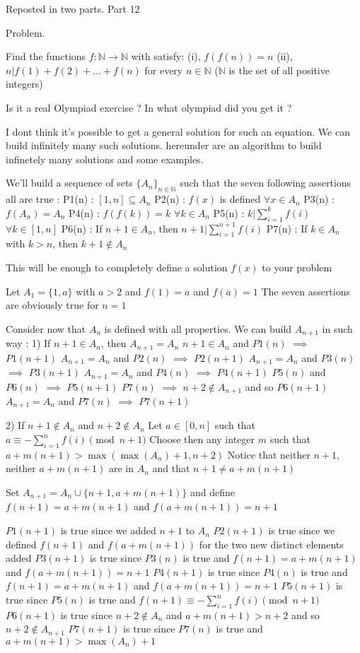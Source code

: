 \begin{solution}
	Reposted in two parts. Part 1\/2
\begin{tcolorbox}\begin{bolded}Problem.\end{bolded} Find the functions $f:\mathbb{N}\rightarrow \mathbb{N}$ with satisfy:
(i), $f(f(n))=n$ 
(ii), $n|f(1)+f(2)+...+f(n)$
for every $n\in \mathbb{N}$ ($\mathbb{N}$ is the set of all positive integers)\end{tcolorbox}
Is it a real Olympiad exercise ?
In what olympiad did you get it ?

I dont think it's possible to get a general solution for such an equation.
We can build infinitely many such solutions. hereunder are an algorithm to build infinetely many solutions and some examples.

We'll build a sequence of sets $\{A_n\}_{n\in\mathbb N}$ such that the seven following assertions all are true :
P1(n) : $[1,n]\subseteq A_n$
P2(n) : $f(x)$ is defined $\forall x\in A_n$
P3(n) : $f(A_n)=A_n$
P4(n) : $f(f(k))=k$ $\forall k\in A_n$
P5(n) : $k|\sum_{i=1}^kf(i)$ $\forall k\in[1,n]$
P6(n) : If $n+1\in A_n$, then $n+1|\sum_{i=1}^{n+1}f(i)$
P7(n) : If $k\in A_n$ with $k>n$, then $k+1\notin A_n$

This will be enough to completely define a solution $f(x)$ to your problem


Let $A_1=\{1,a\}$ with $a>2$ and $f(1)=a$ and $f(a)=1$
The seven assertions are obviously true for $n=1$

Consider now that $A_n$ is defined with all properties. We can build $A_{n+1}$ in such way :
1) If $n+1\in A_n$, then $A_{n+1}=A_n$
$n+1\in A_n$ and $P1(n)$ $\implies$ $P1(n+1)$
$A_{n+1}=A_n$ and $P2(n)$ $\implies$ $P2(n+1)$
$A_{n+1}=A_n$ and $P3(n)$ $\implies$ $P3(n+1)$
$A_{n+1}=A_n$ and $P4(n)$ $\implies$ $P4(n+1)$
$P5(n)$ and $P6(n)$ $\implies$ $P5(n+1)$
$P7(n)$ $\implies$ $n+2\notin A_{n+1}$ and so $P6(n+1)$
$A_{n+1}=A_n$ and $P7(n)$ $\implies$ $P7(n+1)$

2) If $n+1\notin A_n$ and $n+2\notin A_n$
Let $a\in[0,n]$ such that $a\equiv -\sum_{i=1}^nf(i)\pmod{n+1}$
Choose then any integer $m$ such that $a+m(n+1)>\max(\max(A_n)+1,n+2)$
Notice that neither $n+1$, neither $a+m(n+1)$ are in $A_n$ and that $n+1\ne a+m(n+1)$ 

Set $A_{n+1}=A_n\cup\{n+1,a+m(n+1)\}$ and define $f(n+1)=a+m(n+1)$ and $f(a+m(n+1))=n+1$

$P1(n+1)$ is true since we added $n+1$ to $A_n$
$P2(n+1)$ is true since we defined $f(n+1)$ and $f(a+m(n+1))$ for the two new distinct elements added
$P3(n+1)$ is true since $P3(n)$ is true and $f(n+1)=a+m(n+1)$ and $f(a+m(n+1))=n+1$
$P4(n+1)$ is true since $P4(n)$ is true and $f(n+1)=a+m(n+1)$ and $f(a+m(n+1))=n+1$
$P5(n+1)$ is true since $P5(n)$ is true and $f(n+1)\equiv -\sum_{i=1}^nf(i)\pmod{n+1}$
$P6(n+1)$ is true since $n+2\notin A_n$ and $a+m(n+1)>n+2$ and so $n+2\notin A_{n+1}$
$P7(n+1)$ is true since $P7(n)$ is true and $a+m(n+1)>\max(A_n)+1$


\end{solution}
